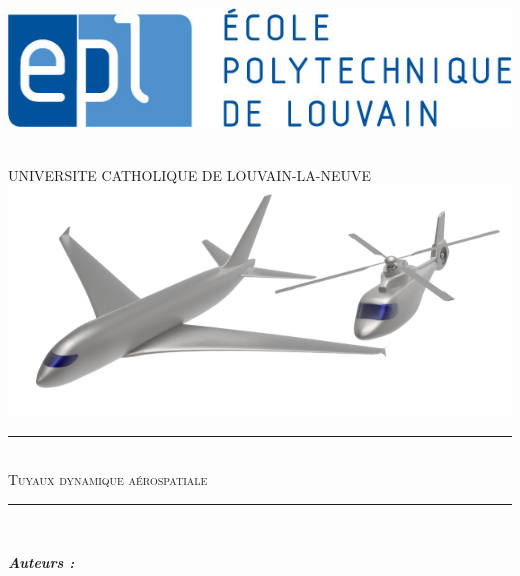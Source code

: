 \begin{titlepage}

\newcommand{\HRule}{\rule{\linewidth}{0.5mm}} %

\center %

\begin{minipage}{0.2\textwidth}
\begin{flushleft} \large
\includegraphics[scale=0.3]{epl-logo.jpg}
\end{flushleft}
\end{minipage}
\begin{minipage}{0.6\textwidth}
\begin{flushright} \large
\end{flushright}
\end{minipage}\\[0.2cm]
{\Large UNIVERSITE CATHOLIQUE DE LOUVAIN-LA-NEUVE}\\[0.1Cm]
\includegraphics[scale=0.8]{1.png}
\\[1.5cm]
\HRule \\[0.3cm]
{ \huge \textsc{Tuyaux dynamique aérospatiale\\ }} %
\HRule \\[3cm]
 
\begin{minipage}{0.4\textwidth}
\begin{flushleft} \large
\emph{\textbf{Auteurs :}}\\


\end{flushleft}
\end{minipage}
\end{titlepage}
